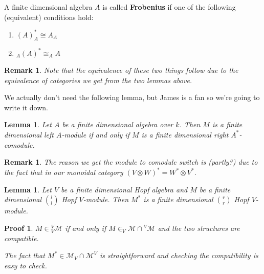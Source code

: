 \documentclass[12pt]{article}
\theoremstyle{break}
\theoremstyle{nonumberbreak}
\theoremstyle{changebreak}
\newtheorem{lem}[thm]{Lemma}
\theoremstyle{break}
\theoremstyle{nonumberbreak}
\newtheorem{prf}{Proof}
\theoremstyle{nonumberplain}
\theoremstyle{change}
\newtheorem{rmk}[thm]{Remark}
\begin{document}
\begin{defn}
	A finite dimensional algebra $A$ is called \textbf{Frobenius} if one of the following (equivalent)
	conditions hold:
	\begin{enumerate}
		\item $(A)^*_A\cong A_A$
		\item $_A(A)^*\cong _AA$
	\end{enumerate}
\end{defn}
\begin{rmk}
	Note that the equivalence of these two things follow due to the equivalence of categories we get
	from the two lemmas above.
\end{rmk}
We actually don't need the following lemma, but James is a fan so we're going to write it down.
\begin{lem}\label{lem-not-needed}
	Let $A$ be a finite dimensional algebra over $k$. Then $M$ is a finite dimensional left $A$-module if
	and only if $M$ is a finite dimensional right $A^*$-comodule.
\end{lem}
\begin{rmk}
	The reason we get the module to comodule switch is (partly?) due to the fact that in our
	monoidal category $(V\otimes W)^*=W^*\otimes V^*.$
\end{rmk}

\begin{lem}
	Let $V$ be a finite dimensional Hopf algebra and $M$ be a finite dimensional $\binom{l}{l}$ Hopf $V$-module.
	Then $M^*$ is a finite dimensional $\binom{r}{r}$ Hopf $V$-module.
\end{lem}
\begin{prf}
	$M\in {_V^V\mathcal{M}}$ if and only if $M\in_V\mathcal{M}\cap {^V\mathcal{M}}$ and the two structures are compatible.

	The fact that $M^*\in \mathcal{M}_V\cap\mathcal{M}^V$ is straightforward and checking the compatibility is easy to check.
\end{prf}
\end{document}
